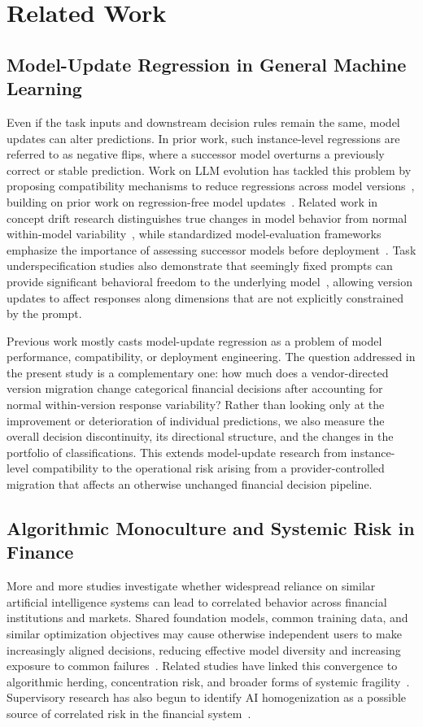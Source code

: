 \documentclass[11pt]{article}
\begin{document}
\section{Related Work}
\subsection{Model-Update Regression in General Machine Learning}
Even if the task inputs and downstream decision rules remain the same, model updates can alter predictions. In prior work, such instance-level regressions are referred to as negative flips, where a successor model overturns a previously correct or stable prediction. Work on LLM evolution has tackled this problem by proposing compatibility mechanisms to reduce regressions across model versions~\cite{muscle}, building on prior work on regression-free model updates~\cite{pctrain}. Related work in concept drift research distinguishes true changes in model behavior from normal within-model variability~\cite{gama}, while standardized model-evaluation frameworks emphasize the importance of assessing successor models before deployment~\cite{helm}. Task underspecification studies also demonstrate that seemingly fixed prompts can provide significant behavioral freedom to the underlying model~\cite{underspec,sclar}, allowing version updates to affect responses along dimensions that are not explicitly constrained by the prompt.

Previous work mostly casts model-update regression as a problem of model performance, compatibility, or deployment engineering. The question addressed in the present study is a complementary one: how much does a vendor-directed version migration change categorical financial decisions after accounting for normal within-version response variability? Rather than looking only at the improvement or deterioration of individual predictions, we also measure the overall decision discontinuity, its directional structure, and the changes in the portfolio of classifications. This extends model-update research from instance-level compatibility to the operational risk arising from a provider-controlled migration that affects an otherwise unchanged financial decision pipeline.

\subsection{Algorithmic Monoculture and Systemic Risk in Finance}
More and more studies investigate whether widespread reliance on similar artificial intelligence systems can lead to correlated behavior across financial institutions and markets. Shared foundation models, common training data, and similar optimization objectives may cause otherwise independent users to make increasingly aligned decisions, reducing effective model diversity and increasing exposure to common failures~\cite{monoculture,kim}. Related studies have linked this convergence to algorithmic herding, concentration risk, and broader forms of systemic fragility~\cite{systemic,homog}. Supervisory research has also begun to identify AI homogenization as a possible source of correlated risk in the financial system~\cite{esrb,fsb}.
\end{document}
